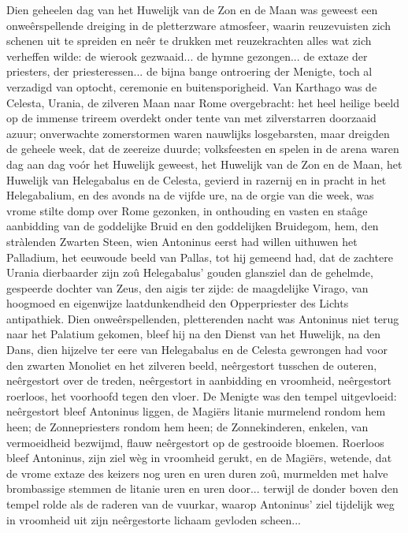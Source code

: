 \documentclass[a4paper, 12pt, oneside, dutch]{article}
\begin{document}
Dien geheelen dag van het Huwelijk van de Zon en de Maan was geweest een onweêrspellende dreiging in de pletterzware atmosfeer, waarin reuzevuisten zich schenen uit te spreiden en neêr te drukken met reuzekrachten alles wat zich verheffen wilde: de wierook gezwaaid... de hymne gezongen... de extaze der priesters, der priesteressen... de bijna bange ontroering der Menigte, toch al verzadigd van optocht, ceremonie en buitensporigheid. Van Karthago was de Celesta, Urania, de zilveren Maan naar Rome overgebracht: het heel heilige beeld op de immense trireem overdekt onder tente van met zilverstarren doorzaaid azuur; onverwachte zomerstormen waren nauwlijks losgebarsten, maar dreigden de geheele week, dat de zeereize duurde; volksfeesten en spelen in de arena waren dag aan dag voór het Huwelijk geweest, het Huwelijk van de Zon en de Maan, het Huwelijk van Helegabalus en de Celesta, gevierd in razernij en in pracht in het Helegabalium, en des avonds na de vijfde ure, na de orgie van die week, was vrome stilte domp over Rome gezonken, in onthouding en vasten en staâge aanbidding van de goddelijke Bruid en den goddelijken Bruidegom, hem, den stràlenden Zwarten Steen, wien Antoninus eerst had willen uithuwen het Palladium, het eeuwoude beeld van Pallas, tot hij gemeend had, dat de zachtere Urania dierbaarder zijn zoû Helegabalus' gouden glansziel dan de gehelmde, gespeerde dochter van Zeus, den aigis ter zijde: de maagdelijke Virago, van hoogmoed en eigenwijze laatdunkendheid den Opperpriester des Lichts antipathiek. Dien onweêrspellenden, pletterenden nacht was Antoninus niet terug naar het Palatium gekomen, bleef hij na den Dienst van het Huwelijk, na den Dans, dien hijzelve ter eere van Helegabalus en de Celesta gewrongen had voor den zwarten Monoliet en het zilveren beeld, neêrgestort tusschen de outeren, neêrgestort over de treden, neêrgestort in aanbidding en vroomheid, neêrgestort roerloos, het voorhoofd tegen den vloer. De Menigte was den tempel uitgevloeid: neêrgestort bleef Antoninus liggen, de Magiërs litanie murmelend rondom hem heen; de Zonnepriesters rondom hem heen; de Zonnekinderen, enkelen, van vermoeidheid bezwijmd, flauw neêrgestort op de gestrooide bloemen. Roerloos bleef Antoninus, zijn ziel wèg in vroomheid gerukt, en de Magiërs, wetende, dat de vrome extaze des keizers nog uren en uren duren zoû, murmelden met halve brombassige stemmen de litanie uren en uren door... terwijl de donder boven den tempel rolde als de raderen van de vuurkar, waarop Antoninus' ziel tijdelijk weg in vroomheid uit zijn neêrgestorte lichaam gevloden scheen...
\end{document}
